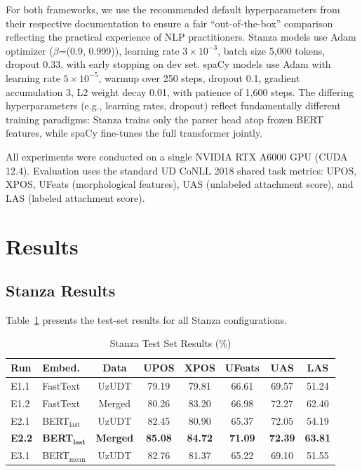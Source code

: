\documentclass[10pt,conference,a4paper]{IEEEtran_EDM}
\begin{document}
For both frameworks, we use the recommended default hyperparameters from their respective documentation to ensure a fair ``out-of-the-box'' comparison reflecting the practical experience of NLP practitioners. Stanza models use Adam optimizer ($\beta$=(0.9, 0.999)), learning rate $3 \times 10^{-3}$, batch size 5,000 tokens, dropout 0.33, with early stopping on dev set. spaCy models use Adam with learning rate $5 \times 10^{-5}$, warmup over 250 steps, dropout 0.1, gradient accumulation 3, L2 weight decay 0.01, with patience of 1,600 steps. The differing hyperparameters (e.g., learning rates, dropout) reflect fundamentally different training paradigms: Stanza trains only the parser head atop frozen BERT features, while spaCy fine-tunes the full transformer jointly.

All experiments were conducted on a single NVIDIA RTX A6000 GPU (CUDA 12.4). Evaluation uses the standard UD CoNLL 2018 shared task metrics: UPOS, XPOS, UFeats (morphological features), UAS (unlabeled attachment score), and LAS (labeled attachment score).

\section{Results}
\label{sec:results}

\subsection{Stanza Results}

Table~\ref{tab:stanza_results} presents the test-set results for all Stanza configurations.

\begin{table}[htbp]
\caption{Stanza Test Set Results (\%)}
\begin{center}
\setlength{\tabcolsep}{3pt}
\begin{tabular}{llcccccc}
\toprule
\textbf{Run} & \textbf{Embed.} & \textbf{Data} & \textbf{UPOS} & \textbf{XPOS} & \textbf{UFeats} & \textbf{UAS} & \textbf{LAS} \\
\midrule
E1.1 & FastText & UzUDT & 79.19 & 79.81 & 66.61 & 69.57 & 51.24 \\
E1.2 & FastText & Merged & 80.26 & 83.20 & 66.98 & 72.27 & 62.40 \\
E2.1 & BERT$_\text{last}$ & UzUDT & 82.45 & 80.90 & 65.37 & 72.05 & 54.19 \\
\textbf{E2.2} & \textbf{BERT}$_\textbf{last}$ & \textbf{Merged} & \textbf{85.08} & \textbf{84.72} & \textbf{71.09} & \textbf{72.39} & \textbf{63.81} \\
E3.1 & BERT$_\text{mean}$ & UzUDT & 82.76 & 81.37 & 65.22 & 69.10 & 51.55 \\
\bottomrule
\end{tabular}
\label{tab:stanza_results}
\end{center}
\end{table}
\end{document}
